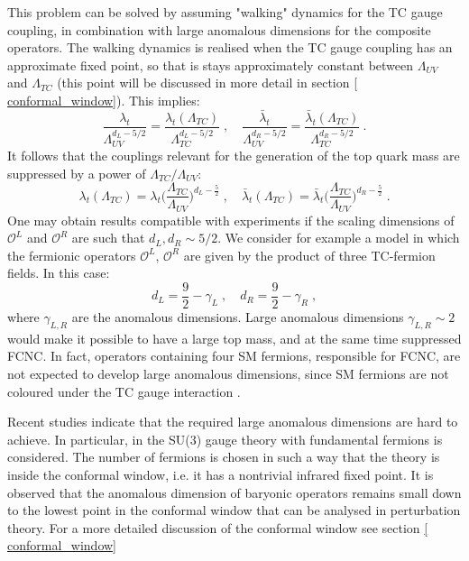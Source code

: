 This problem can be solved by assuming "walking" dynamics for the TC gauge coupling, in combination with large anomalous dimensions for the composite operators. The walking dynamics is realised when the TC gauge coupling has an approximate fixed point, so that is stays approximately constant between $\Lambda_{UV}$ and $\Lambda_{TC}$ (this point will be discussed in more detail in section \ref{ conformal_window}). This implies:
\begin{equation}
\frac{\lambda_t}{\Lambda_{UV}^{d_L - 5/2}}  = \frac{\lambda_t(\Lambda_{TC})}{\Lambda_{TC}^{d_L - 5/2}} \; , \quad \frac{\bar \lambda_t}{\Lambda_{UV}^{d_R - 5/2}}  = \frac{\bar \lambda_t(\Lambda_{TC})}{\Lambda_{TC}^{d_R - 5/2}} \: .
\end{equation}
%
It follows that the couplings relevant for the generation of the top quark mass are suppressed by a power of $\Lambda_{TC}/\Lambda_{UV}$:
\begin{equation}
\lambda_t (\Lambda_{TC}) =  \lambda_t \biggl( \frac{\Lambda_{TC}}{\Lambda_{UV}} \biggr)^{d_L - \frac{5}{2}} \; , \quad \bar \lambda_t (\Lambda_{TC}) =  \bar \lambda_t \biggl( \frac{\Lambda_{TC}}{\Lambda_{UV}} \biggr)^{d_R - \frac{5}{2}} \; .
\end{equation}
%
One may obtain results compatible with experiments if the scaling dimensions of $\mathcal O^L$ and $\mathcal O^R$ are such that $d_L , d_R \sim 5/2$. We consider for example a model in which the fermionic operators $\mathcal O^L$, $\mathcal O^R$ are given by the product of three TC-fermion fields. In this case:
\begin{equation}
d_L = \frac{9}{2} - \gamma_L \; , \quad d_R = \frac{9}{2} - \gamma_R   \; ,
\end{equation}
%
where $\gamma_{L,R}$ are the anomalous dimensions. Large anomalous dimensions $\gamma_{L,R} \sim 2$ would make it possible to have a large top mass, and at the same time suppressed FCNC. In fact, operators containing four SM fermions, responsible for FCNC, are not expected to develop large anomalous dimensions, since SM fermions are not coloured under the  TC gauge interaction \cite{Kaplan:1991dc}. 

Recent studies indicate that the required large anomalous dimensions are hard to achieve. In particular, in \cite{Pica:2016rmv} the SU(3) gauge theory with fundamental fermions is considered. The number of fermions is chosen in such a way that the theory is inside the conformal window, i.e. it has a nontrivial infrared fixed point. It is observed that the anomalous dimension of baryonic operators remains small down to the lowest point in the conformal window that can be analysed in perturbation theory. For a more detailed discussion of the conformal window see section \ref{ conformal_window}



